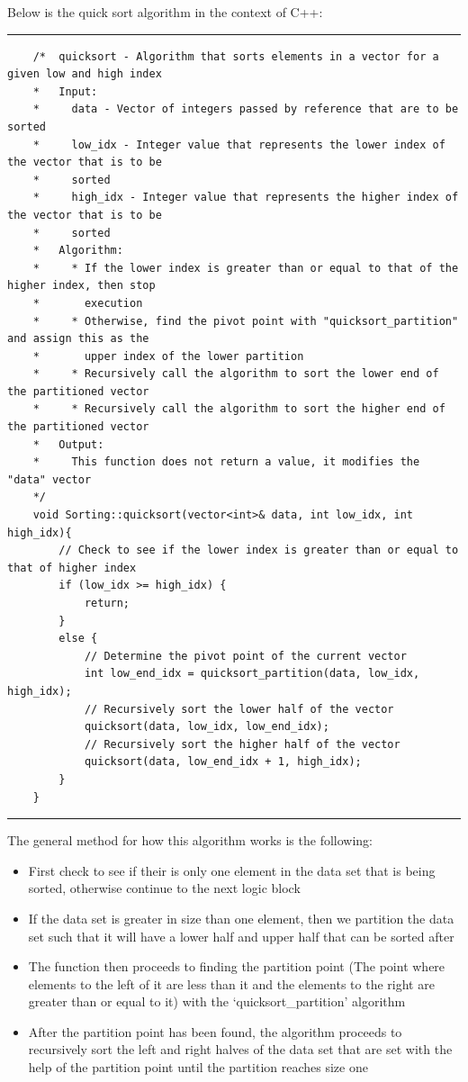 \documentclass[a4paper,9pt]{article}
\newcommand{\horizontalline}{\noindent \rule{\textwidth}{0.5pt}\par}
\begin{document}
\begin{highlight}
    Below is the quick sort algorithm in the context of C++:

    \horizontalline

    \begin{verbatim}
    /*  quicksort - Algorithm that sorts elements in a vector for a given low and high index
    *   Input:
    *     data - Vector of integers passed by reference that are to be sorted
    *     low_idx - Integer value that represents the lower index of the vector that is to be 
    *     sorted
    *     high_idx - Integer value that represents the higher index of the vector that is to be 
    *     sorted
    *   Algorithm:
    *     * If the lower index is greater than or equal to that of the higher index, then stop 
    *       execution
    *     * Otherwise, find the pivot point with "quicksort_partition" and assign this as the 
    *       upper index of the lower partition
    *     * Recursively call the algorithm to sort the lower end of the partitioned vector
    *     * Recursively call the algorithm to sort the higher end of the partitioned vector
    *   Output:
    *     This function does not return a value, it modifies the "data" vector
    */
    void Sorting::quicksort(vector<int>& data, int low_idx, int high_idx){
        // Check to see if the lower index is greater than or equal to that of higher index
        if (low_idx >= high_idx) {
            return;
        }
        else {
            // Determine the pivot point of the current vector
            int low_end_idx = quicksort_partition(data, low_idx, high_idx);
            // Recursively sort the lower half of the vector
            quicksort(data, low_idx, low_end_idx);
            // Recursively sort the higher half of the vector
            quicksort(data, low_end_idx + 1, high_idx);
        }
    }
    \end{verbatim}

    \horizontalline

    The general method for how this algorithm works is the following:

    \begin{itemize}
        \item First check to see if their is only one element in the data set that is being sorted, otherwise continue to the next logic block
        \item If the data set is greater in size than one element, then we partition the data set such that it will have a lower half and upper half that can be sorted after
        \item The function then proceeds to finding the partition point (The point where elements to the left of it are less than it and the elements to the right are greater than or equal to it) with the `quicksort\_partition' algorithm
        \item After the partition point has been found, the algorithm proceeds to recursively sort the left and right halves of the data set that are set with the help of the partition point until the partition reaches size one
    \end{itemize}


\end{highlight}
\end{document}
